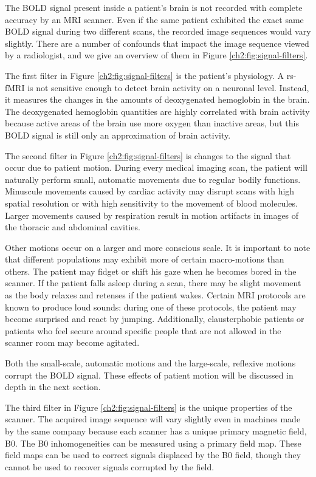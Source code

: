 The BOLD signal present inside a patient's brain is not recorded with complete accuracy by an MRI scanner. Even if the same patient exhibited the exact same BOLD signal during two different scans, the recorded image sequences would vary slightly. There are a number of confounds that impact the image sequence viewed by a radiologist, and we give an overview of them in Figure \ref{ch2:fig:signal-filters}. 

The first filter in Figure \ref{ch2:fig:signal-filters} is the patient's physiology. A rs-fMRI is not sensitive enough to detect brain activity on a neuronal level. Instead, it measures the changes in the amounts of deoxygenated hemoglobin in the brain. The deoxygenated hemoglobin quantities are highly correlated with brain activity because active areas of the brain use more oxygen than inactive areas, but this BOLD signal is still only an approximation of brain activity.

The second filter in Figure \ref{ch2:fig:signal-filters} is changes to the signal that occur due to patient motion.
During every medical imaging scan, the patient will naturally perform small, automatic movements due to regular bodily functions. Minuscule movements caused by cardiac activity may disrupt scans with high spatial resolution or with high sensitivity to the movement of blood molecules. Larger movements caused by respiration result in motion artifacts in images of the thoracic and abdominal cavities. 

Other motions occur on a larger and more conscious scale. It is important to note that different populations may exhibit more of certain macro-motions than others. The patient may fidget or shift his gaze when he becomes bored in the scanner. If the patient falls asleep during a scan, there may be slight movement as the body relaxes and retenses if the patient wakes. Certain MRI protocols are known to produce loud sounds: during one of these protocols, the patient may become surprised and react by jumping. Additionally, clausterphobic patients or patients who feel secure around specific people that are not allowed in the scanner room may become agitated. 

Both the small-scale, automatic motions and the large-scale, reflexive motions corrupt the BOLD signal. These effects of patient motion will be discussed in depth in the next section.

The third filter in Figure \ref{ch2:fig:signal-filters} is the unique properties of the scanner. The acquired image sequence will vary slightly even in machines made by the same company because each scanner has a unique primary magnetic field, B0. The B0 inhomogeneities can be measured using a primary field map. These field maps can be used to correct signals displaced by the B0 field, though they cannot be used to recover signals corrupted by the field.

